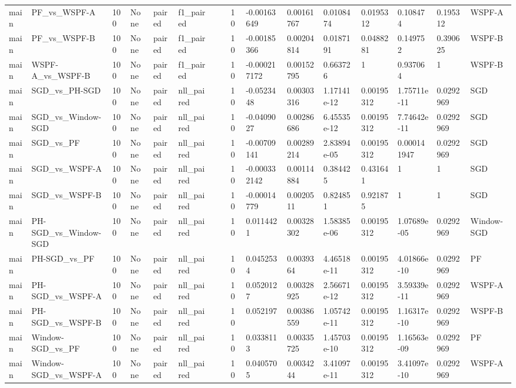 \begin{tabular}{llllllllllllllll}
main & PF\_vs\_WSPF-A & 100 & None & paired & f1\_paired &  &  & 10 & -0.00163649 & 0.00161767 & 0.0108474 & 0.0195312 & 0.108474 & 0.195312 & WSPF-A \\
main & PF\_vs\_WSPF-B & 100 & None & paired & f1\_paired &  &  & 10 & -0.00185366 & 0.00204814 & 0.0187191 & 0.0488281 & 0.149752 & 0.390625 & WSPF-B \\
main & WSPF-A\_vs\_WSPF-B & 100 & None & paired & f1\_paired &  &  & 10 & -0.000217172 & 0.00152795 & 0.663726 & 1 & 0.937064 & 1 & WSPF-B \\
main & SGD\_vs\_PH-SGD & 100 & None & paired & nll\_paired &  &  & 10 & -0.0523448 & 0.00303316 & 1.17141e-12 & 0.00195312 & 1.75711e-11 & 0.0292969 & SGD \\
main & SGD\_vs\_Window-SGD & 100 & None & paired & nll\_paired &  &  & 10 & -0.0409027 & 0.00286686 & 6.45535e-12 & 0.00195312 & 7.74642e-11 & 0.0292969 & SGD \\
main & SGD\_vs\_PF & 100 & None & paired & nll\_paired &  &  & 10 & -0.00709141 & 0.00289214 & 2.83894e-05 & 0.00195312 & 0.000141947 & 0.0292969 & SGD \\
main & SGD\_vs\_WSPF-A & 100 & None & paired & nll\_paired &  &  & 10 & -0.000332142 & 0.00114884 & 0.384425 & 0.431641 & 1 & 1 & SGD \\
main & SGD\_vs\_WSPF-B & 100 & None & paired & nll\_paired &  &  & 10 & -0.00014779 & 0.0020511 & 0.824851 & 0.921875 & 1 & 1 & SGD \\
main & PH-SGD\_vs\_Window-SGD & 100 & None & paired & nll\_paired &  &  & 10 & 0.0114421 & 0.00328302 & 1.58385e-06 & 0.00195312 & 1.07689e-05 & 0.0292969 & Window-SGD \\
main & PH-SGD\_vs\_PF & 100 & None & paired & nll\_paired &  &  & 10 & 0.0452534 & 0.0039364 & 4.46518e-11 & 0.00195312 & 4.01866e-10 & 0.0292969 & PF \\
main & PH-SGD\_vs\_WSPF-A & 100 & None & paired & nll\_paired &  &  & 10 & 0.0520127 & 0.00328925 & 2.56671e-12 & 0.00195312 & 3.59339e-11 & 0.0292969 & WSPF-A \\
main & PH-SGD\_vs\_WSPF-B & 100 & None & paired & nll\_paired &  &  & 10 & 0.052197 & 0.00386559 & 1.05742e-11 & 0.00195312 & 1.16317e-10 & 0.0292969 & WSPF-B \\
main & Window-SGD\_vs\_PF & 100 & None & paired & nll\_paired &  &  & 10 & 0.0338113 & 0.00335725 & 1.45703e-10 & 0.00195312 & 1.16563e-09 & 0.0292969 & PF \\
main & Window-SGD\_vs\_WSPF-A & 100 & None & paired & nll\_paired &  &  & 10 & 0.0405705 & 0.0034244 & 3.41097e-11 & 0.00195312 & 3.41097e-10 & 0.0292969 & WSPF-A \\

\end{tabular}
